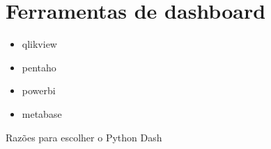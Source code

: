 \chapter{Ferramentas de dashboard}
\begin{itemize}
	\item qlikview
	
	\item pentaho
	
	\item powerbi
	
	\item metabase
\end{itemize}

Razões para escolher o Python Dash
